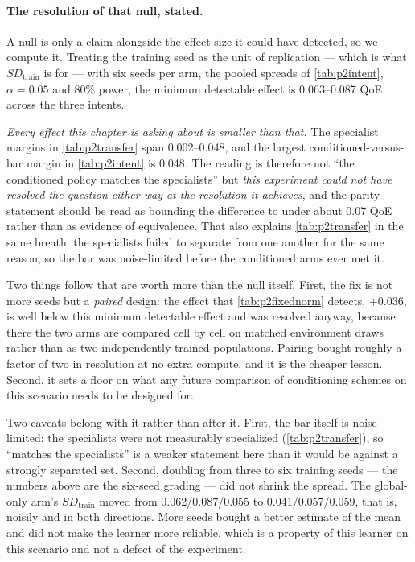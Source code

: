 \paragraph{The resolution of that null, stated.} A null is only a claim alongside the effect size it
could have detected, so we compute it. Treating the training seed as the unit of replication --- which
is what $\mathit{SD}_{\mathrm{train}}$ is for --- with six seeds per arm, the pooled spreads of
\cref{tab:p2intent}, $\alpha = 0.05$ and 80\% power, the minimum detectable effect is
\SIrange{0.063}{0.087}{} QoE across the three intents.

\emph{Every effect this chapter is asking about is smaller than that.} The specialist margins in
\cref{tab:p2transfer} span 0.002--0.048, and the largest conditioned-versus-bar margin in
\cref{tab:p2intent} is 0.048. The reading is therefore not ``the conditioned policy matches the specialists'' but \emph{this experiment could not have resolved the question either way at the
resolution it achieves}, and the parity statement should be read as bounding the difference to under
about 0.07 QoE rather than as evidence of equivalence. That also explains \cref{tab:p2transfer} in the
same breath: the specialists failed to separate from one another for the same reason, so the bar was
noise-limited before the conditioned arms ever met it.

Two things follow that are worth more than the null itself. First, the fix is not more seeds but a
\emph{paired} design: the effect that \cref{tab:p2fixednorm} detects, $+0.036$, is well below this
minimum detectable effect and was resolved anyway, because there the two arms are compared cell by cell
on matched environment draws rather than as two independently trained populations. Pairing bought
roughly a factor of two in resolution at no extra compute, and it is the cheaper lesson. Second, it
sets a floor on what any future comparison of conditioning schemes on this scenario needs to be
designed for.

Two caveats belong with it rather than after it. First, the bar itself is noise-limited: the specialists
were not measurably specialized (\cref{tab:p2transfer}), so ``matches the specialists'' is a weaker
statement here than it would be against a strongly separated set. Second, doubling from three to six
training seeds --- the numbers above are the six-seed grading --- did not shrink the spread. The
global-only arm's $\mathit{SD}_{\mathrm{train}}$ moved from 0.062/0.087/0.055 to 0.041/0.057/0.059, that
is, noisily and in both directions. More seeds bought a better estimate of the mean and did not make the
learner more reliable, which is a property of this learner on this scenario and not a defect of the
experiment.

